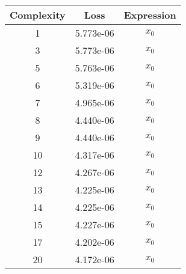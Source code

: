 \begin{center}
        \begin{tabular}{|c|c|c|}
        \hline
        Complexity & Loss & Expression \\
        \hline
        1 & 5.773e-06 & $\begin{aligned}x_{0}\end{aligned}$\\ \hline3 & 5.773e-06 & $\begin{aligned}x_{0}\end{aligned}$\\ \hline5 & 5.763e-06 & $\begin{aligned}x_{0}\end{aligned}$\\ \hline6 & 5.319e-06 & $\begin{aligned}x_{0}\end{aligned}$\\ \hline7 & 4.965e-06 & $\begin{aligned}x_{0}\end{aligned}$\\ \hline8 & 4.440e-06 & $\begin{aligned}x_{0}\end{aligned}$\\ \hline9 & 4.440e-06 & $\begin{aligned}x_{0}\end{aligned}$\\ \hline10 & 4.317e-06 & $\begin{aligned}x_{0}\end{aligned}$\\ \hline12 & 4.267e-06 & $\begin{aligned}x_{0}\end{aligned}$\\ \hline13 & 4.225e-06 & $\begin{aligned}x_{0}\end{aligned}$\\ \hline14 & 4.225e-06 & $\begin{aligned}x_{0}\end{aligned}$\\ \hline15 & 4.227e-06 & $\begin{aligned}x_{0}\end{aligned}$\\ \hline17 & 4.202e-06 & $\begin{aligned}x_{0}\end{aligned}$\\ \hline20 & 4.172e-06 & $\begin{aligned}x_{0}\end{aligned}$\\ \hline\end{tabular}
        \end{center}
        